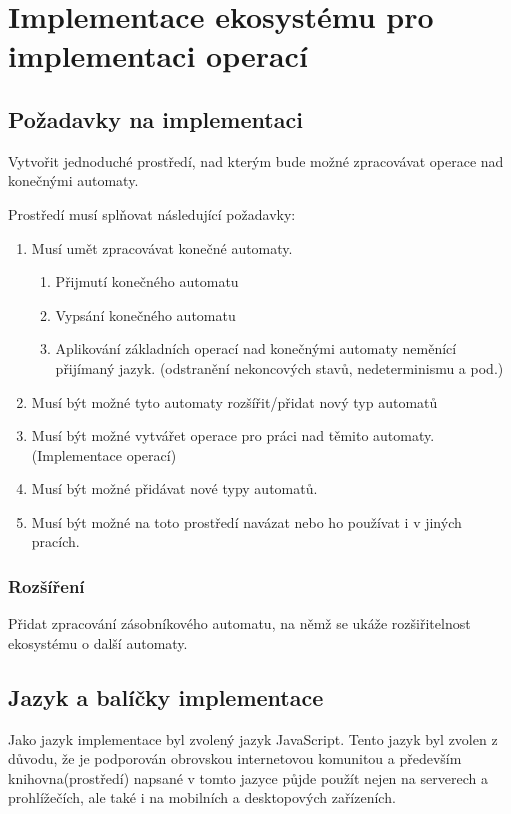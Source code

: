 \chapter{Implementace ekosystému pro implementaci operací} \label{chap:Implementace}
\section{Požadavky na implementaci}
Vytvořit jednoduché prostředí, nad kterým bude možné zpracovávat operace nad konečnými automaty.

Prostředí musí splňovat následující požadavky:
\begin{enumerate}
    \item Musí umět zpracovávat konečné automaty.
    \begin{enumerate}
        \item Přijmutí konečného automatu
        \item Vypsání konečného automatu
        \item Aplikování základních operací nad konečnými automaty neměnící přijímaný jazyk. (odstranění nekoncových stavů, nedeterminismu a pod.)
    \end{enumerate}
    \item Musí být možné tyto automaty rozšířit/přidat nový typ automatů
    \item Musí být možné vytvářet operace pro práci nad těmito automaty. (Implementace operací)
    \item Musí být možné přidávat nové typy automatů.
    \item Musí být možné na toto prostředí navázat nebo ho používat i v jiných pracích.
\end{enumerate}

\subsection{Rozšíření}
	Přidat zpracování zásobníkového automatu, na němž se ukáže rozšiřitelnost ekosystému o další automaty.

\section{Jazyk a balíčky implementace}
Jako jazyk implementace byl zvolený jazyk JavaScript. Tento jazyk byl zvolen z důvodu, že je podporován obrovskou internetovou komunitou a především knihovna(prostředí) napsané v tomto jazyce půjde použít nejen na serverech a prohlížečích, ale také i na mobilních a desktopových zařízeních.

